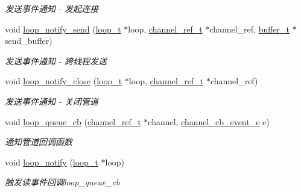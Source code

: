 \begin{DoxyCompactItemize}
\begin{DoxyCompactList}\small\item\em 发送事件通知 -\/ 发起连接 \end{DoxyCompactList}\item 
void \hyperlink{a00070_ad023112870f736a601137129420a94b9_ad023112870f736a601137129420a94b9}{loop\+\_\+notify\+\_\+send} (\hyperlink{a00051_a9c3ad1cd2de83e09f3a7b59fa82c94ee_a9c3ad1cd2de83e09f3a7b59fa82c94ee}{loop\+\_\+t} $\ast$loop, \hyperlink{a00051_a151271c9d188ef28d4d24bb81dcc1263_a151271c9d188ef28d4d24bb81dcc1263}{channel\+\_\+ref\+\_\+t} $\ast$channel\+\_\+ref, \hyperlink{a00051_aad99a77d28bd81d3d36d0ea569c9482d_aad99a77d28bd81d3d36d0ea569c9482d}{buffer\+\_\+t} $\ast$send\+\_\+buffer)
\begin{DoxyCompactList}\small\item\em 发送事件通知 -\/ 跨线程发送 \end{DoxyCompactList}\item 
void \hyperlink{a00070_a6c9f3ec8e93c6e7b10ebb4dcaca562d4_a6c9f3ec8e93c6e7b10ebb4dcaca562d4}{loop\+\_\+notify\+\_\+close} (\hyperlink{a00051_a9c3ad1cd2de83e09f3a7b59fa82c94ee_a9c3ad1cd2de83e09f3a7b59fa82c94ee}{loop\+\_\+t} $\ast$loop, \hyperlink{a00051_a151271c9d188ef28d4d24bb81dcc1263_a151271c9d188ef28d4d24bb81dcc1263}{channel\+\_\+ref\+\_\+t} $\ast$channel\+\_\+ref)
\begin{DoxyCompactList}\small\item\em 发送事件通知 -\/ 关闭管道 \end{DoxyCompactList}\item 
void \hyperlink{a00070_a970d2bf2e65270fe3d93de1e22a4d34c_a970d2bf2e65270fe3d93de1e22a4d34c}{loop\+\_\+queue\+\_\+cb} (\hyperlink{a00051_a151271c9d188ef28d4d24bb81dcc1263_a151271c9d188ef28d4d24bb81dcc1263}{channel\+\_\+ref\+\_\+t} $\ast$channel, \hyperlink{a00051_aaf2cba5d4035f3d56350b59342ebf65c_aaf2cba5d4035f3d56350b59342ebf65c}{channel\+\_\+cb\+\_\+event\+\_\+e} e)
\begin{DoxyCompactList}\small\item\em 通知管道回调函数 \end{DoxyCompactList}\item 
void \hyperlink{a00070_a3857990b0f1f9e27e000b5924b88a958_a3857990b0f1f9e27e000b5924b88a958}{loop\+\_\+notify} (\hyperlink{a00051_a9c3ad1cd2de83e09f3a7b59fa82c94ee_a9c3ad1cd2de83e09f3a7b59fa82c94ee}{loop\+\_\+t} $\ast$loop)
\begin{DoxyCompactList}\small\item\em 触发读事件回调loop\+\_\+queue\+\_\+cb \end{DoxyCompactList}\item 

\end{DoxyCompactItemize}
